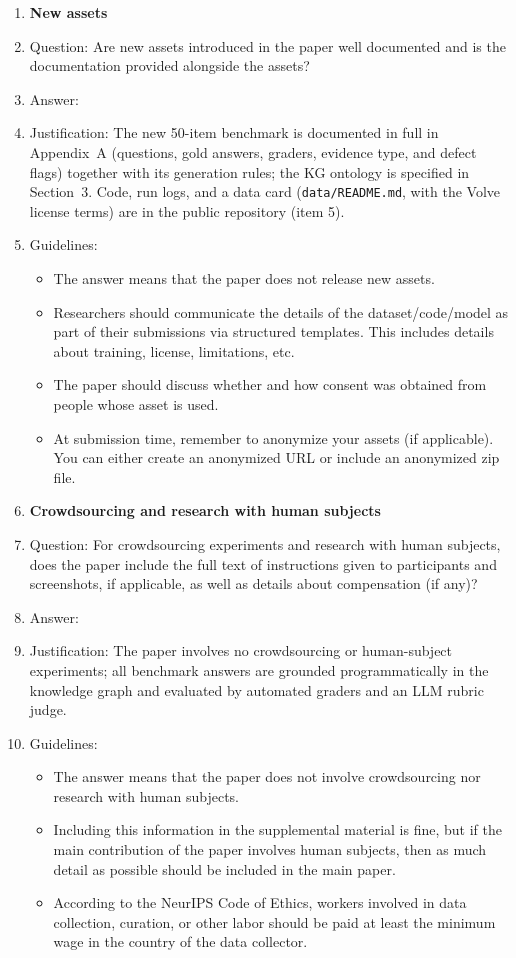 \begin{enumerate}
\item {\bf New assets}
    \item[] Question: Are new assets introduced in the paper well documented and is the documentation provided alongside the assets?
    \item[] Answer: \answerYes{}
    \item[] Justification: The new 50-item benchmark is documented in full in Appendix~A (questions, gold answers, graders, evidence type, and defect flags) together with its generation rules; the KG ontology is specified in Section~3. Code, run logs, and a data card (\texttt{data/README.md}, with the Volve license terms) are in the public repository (item 5).
    \item[] Guidelines:
    \begin{itemize}
        \item The answer \answerNA{} means that the paper does not release new assets.
        \item Researchers should communicate the details of the dataset\slash code\slash model as part of their submissions via structured templates. This includes details about training, license, limitations, etc. 
        \item The paper should discuss whether and how consent was obtained from people whose asset is used.
        \item At submission time, remember to anonymize your assets (if applicable). You can either create an anonymized URL or include an anonymized zip file.
    \end{itemize}

\item {\bf Crowdsourcing and research with human subjects}
    \item[] Question: For crowdsourcing experiments and research with human subjects, does the paper include the full text of instructions given to participants and screenshots, if applicable, as well as details about compensation (if any)? 
    \item[] Answer: \answerNA{}
    \item[] Justification: The paper involves no crowdsourcing or human-subject experiments; all benchmark answers are grounded programmatically in the knowledge graph and evaluated by automated graders and an LLM rubric judge.
    \item[] Guidelines:
    \begin{itemize}
        \item The answer \answerNA{} means that the paper does not involve crowdsourcing nor research with human subjects.
        \item Including this information in the supplemental material is fine, but if the main contribution of the paper involves human subjects, then as much detail as possible should be included in the main paper. 
        \item According to the NeurIPS Code of Ethics, workers involved in data collection, curation, or other labor should be paid at least the minimum wage in the country of the data collector. 
    \end{itemize}


\end{enumerate}
